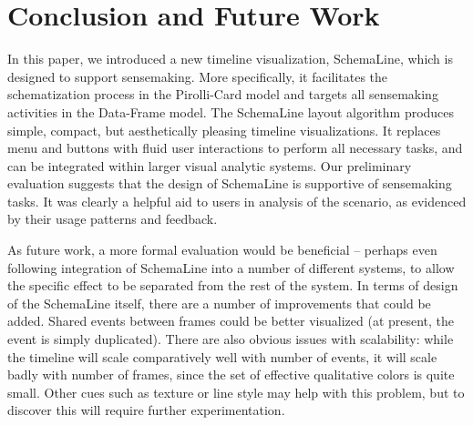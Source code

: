 \section{Conclusion and Future Work}
\label{sec:conclusion}

In this paper, we introduced a new timeline visualization, SchemaLine, which is designed to support sensemaking. More specifically, it facilitates the schematization process in the Pirolli-Card model and targets all sensemaking activities in the Data-Frame model. The SchemaLine layout algorithm produces simple, compact, but aesthetically pleasing timeline visualizations. It replaces menu and buttons with fluid user interactions to perform all necessary tasks, and can be integrated within larger visual analytic systems. Our preliminary evaluation suggests that the design of SchemaLine is supportive of sensemaking tasks. It was clearly a helpful aid to users in analysis of the scenario, as evidenced by their usage patterns and feedback. 

As future work, a more formal evaluation would be beneficial -- perhaps even following integration of SchemaLine into a number of different systems, to allow the specific effect to be separated from the rest of the system. In terms of design of the SchemaLine itself, there are a number of improvements that could be added. Shared events between frames could be better visualized (at present, the event is simply duplicated). There are also obvious issues with scalability: while the timeline will scale comparatively well with number of events, it will scale badly with number of frames, since the set of effective qualitative colors is quite small. Other cues such as texture or line style may help with this problem, but to discover this will require further experimentation.